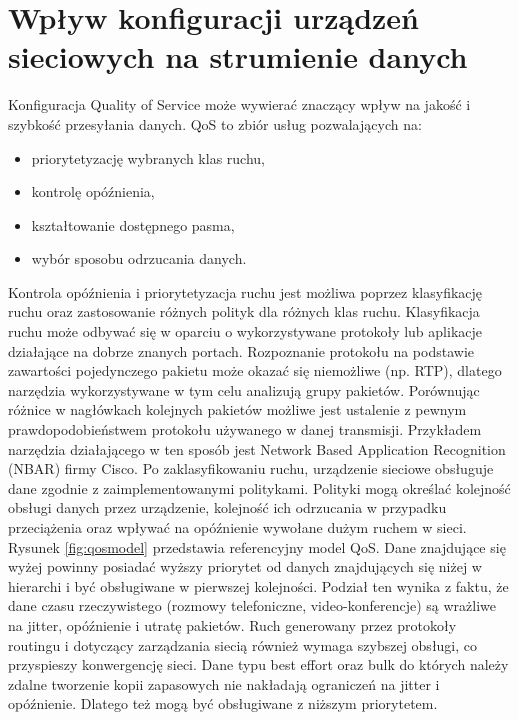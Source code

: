 \section{Wpływ konfiguracji urządzeń sieciowych na strumienie danych}

Konfiguracja Quality of Service może wywierać znaczący wpływ na jakość i szybkość przesyłania danych. QoS to zbiór usług pozwalających na:
\begin{itemize}
\item priorytetyzację wybranych klas ruchu,
\item kontrolę opóźnienia,
\item kształtowanie dostępnego pasma,
\item wybór sposobu odrzucania danych.
\end{itemize}

Kontrola opóźnienia i priorytetyzacja ruchu jest możliwa poprzez klasyfikację ruchu oraz zastosowanie różnych polityk dla różnych klas ruchu. Klasyfikacja ruchu może odbywać się w oparciu o wykorzystywane protokoły lub aplikacje działające na dobrze znanych portach. Rozpoznanie protokołu na podstawie zawartości pojedynczego pakietu może okazać się niemożliwe (np. RTP), dlatego narzędzia wykorzystywane w tym celu analizują grupy pakietów. Porównując różnice w nagłówkach kolejnych pakietów możliwe jest ustalenie z pewnym prawdopodobieństwem protokołu używanego w danej transmisji. Przykładem narzędzia działającego w ten sposób jest Network Based Application Recognition (NBAR) firmy Cisco. Po zaklasyfikowaniu ruchu, urządzenie sieciowe obsługuje dane zgodnie z zaimplementowanymi politykami. Polityki mogą określać kolejność obsługi danych przez urządzenie, kolejność ich odrzucania w przypadku przeciążenia oraz wpływać na opóźnienie wywołane dużym ruchem w sieci. Rysunek \ref{fig:qosmodel} przedstawia referencyjny model QoS. Dane znajdujące się wyżej powinny posiadać wyższy priorytet od danych znajdujących się niżej w hierarchi i być obsługiwane w pierwszej kolejności. Podział ten wynika z faktu, że dane czasu rzeczywistego (rozmowy telefoniczne, video-konferencje) są wrażliwe na jitter, opóźnienie i utratę pakietów. Ruch generowany przez protokoły routingu i dotyczący zarządzania siecią również wymaga szybszej obsługi, co przyspieszy konwergencję sieci. Dane typu best effort oraz bulk do których należy zdalne tworzenie kopii zapasowych nie nakładają ograniczeń na jitter i opóźnienie. Dlatego też mogą być obsługiwane z niższym priorytetem.

